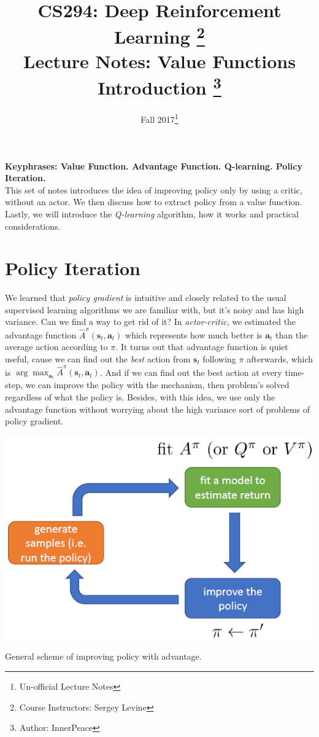 \documentclass{tufte-handout}
\title{CS294: Deep Reinforcement Learning
       \thanks{Course Instructors: Sergey Levine} \\
       \Large Lecture Notes: Value Functions Introduction \thanks{Author: InnerPeace}}
\date{Fall 2017\thanks{Un-official Lecture Notes}} %
\newcommand{\s}{\mathbf{s}}
\newcommand{\act}{\mathbf{a}}
\begin{document}
\maketitle%

\textbf{Keyphrases: Value Function. Advantage Function. Q-learning. Policy Iteration. }\\

\noindent{}This set of notes introduces the idea of improving policy only by using a critic, without an actor. We then discuss how to extract policy from a value function. Lastly, we will introduce the \emph{Q-learning} algorithm, how it works and practical considerations.

\section{Policy Iteration}

We learned that \emph{policy gradient} is intuitive and closely related to the usual supervised learning algorithms we are familiar with, but it's noisy
and has high variance. Can we find a way to get rid of it? In \emph{actor-critic}, we estimated the advantage function $\hat{A}^\pi(\s_t, \act_t)$
which represents how much better is $\act_t$ than the average action according to $\pi$. It turns out that advantage function is quiet useful, cause we can
find out the \emph{best} action from $\s_t$ following $\pi$ afterwards, which is $\arg \max_{\act_t} \hat{A}^\pi(\s_t, \act_t)$. And if we can find out the
best action at every time-step, we can improve the policy with the mechanism, then problem's solved regardless of what the policy is. Besides, with this idea, we use only the advantage function without worrying about the high variance sort of problems of policy gradient.

\begin{marginfigure}
\centering
\includegraphics[width=\linewidth]{intro}
\caption{General scheme of improving policy with advantage.}
\label{fig:intro}
\end{marginfigure}
\end{document}
